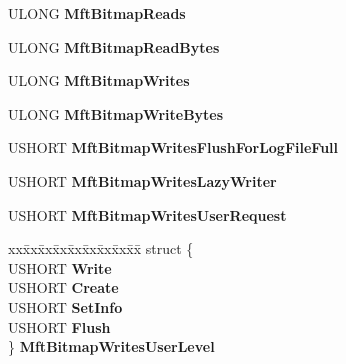 \begin{DoxyCompactItemize}
\begin{tabbing}
\end{tabbing}\item 
\mbox{\label{struct___n_t_f_s___s_t_a_t_i_s_t_i_c_s_a53184d56b665cfe781a1b78a4ce487d4}} 
U\+L\+O\+NG {\bfseries Mft\+Bitmap\+Reads}
\item 
\mbox{\label{struct___n_t_f_s___s_t_a_t_i_s_t_i_c_s_a1f34ea1018947ec68f2dd06f848a6407}} 
U\+L\+O\+NG {\bfseries Mft\+Bitmap\+Read\+Bytes}
\item 
\mbox{\label{struct___n_t_f_s___s_t_a_t_i_s_t_i_c_s_ab9f24b56b29e93dec8475215ff59862e}} 
U\+L\+O\+NG {\bfseries Mft\+Bitmap\+Writes}
\item 
\mbox{\label{struct___n_t_f_s___s_t_a_t_i_s_t_i_c_s_ae3ec6362134cb9e1c85eba2077bb67ea}} 
U\+L\+O\+NG {\bfseries Mft\+Bitmap\+Write\+Bytes}
\item 
\mbox{\label{struct___n_t_f_s___s_t_a_t_i_s_t_i_c_s_ad570cf6632893dbd98f47ce2e840375b}} 
U\+S\+H\+O\+RT {\bfseries Mft\+Bitmap\+Writes\+Flush\+For\+Log\+File\+Full}
\item 
\mbox{\label{struct___n_t_f_s___s_t_a_t_i_s_t_i_c_s_ae84de843a49c08ec19d589f1be87803a}} 
U\+S\+H\+O\+RT {\bfseries Mft\+Bitmap\+Writes\+Lazy\+Writer}
\item 
\mbox{\label{struct___n_t_f_s___s_t_a_t_i_s_t_i_c_s_ae61f1e47155eadddafb5f5749663cafd}} 
U\+S\+H\+O\+RT {\bfseries Mft\+Bitmap\+Writes\+User\+Request}
\item 
\mbox{\label{struct___n_t_f_s___s_t_a_t_i_s_t_i_c_s_a1d328c8256e8e7f7c2ce88c3d1a3c72d}} 
\begin{tabbing}
xx\=xx\=xx\=xx\=xx\=xx\=xx\=xx\=xx\=\kill
struct \{\\
\>USHORT {\bfseries Write}\\
\>USHORT {\bfseries Create}\\
\>USHORT {\bfseries SetInfo}\\
\>USHORT {\bfseries Flush}\\
\} {\bfseries MftBitmapWritesUserLevel}\\


\end{tabbing}
\end{DoxyCompactItemize}
